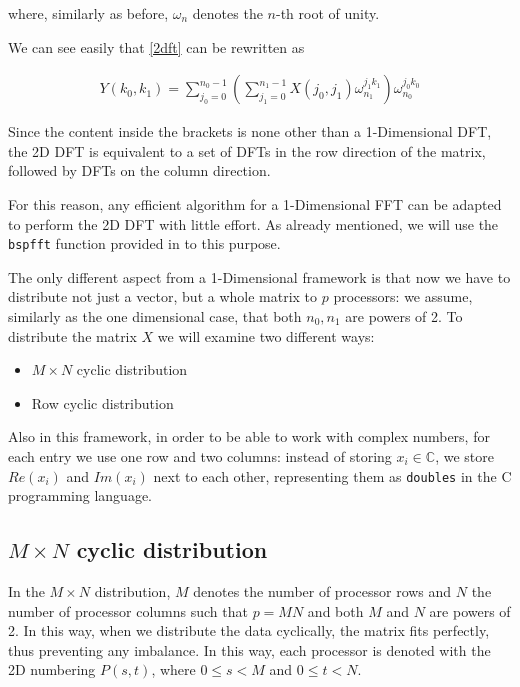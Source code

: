 \documentclass[a4paper,11pt]{article}
\newcommand{\C}{\mathbb{C}}
\begin{document}
where, similarly as before, $\omega_n$ denotes the $n$-th root of unity.

We can see easily that \eqref{2dft} can be rewritten as

\begin{align}
 \label{2dft-1} Y(k_0,k_1) = \sum_{j_0=0}^{n_0-1} \left(\sum_{j_1=0}^{n_1-1} X(j_0,j_1)  \omega_{n_1}^{j_1 k_1} \right) \omega_{n_0}^{j_0 k_0}
\end{align}

Since the content inside the brackets is none other than a 1-Dimensional DFT, the 2D DFT is equivalent to a set of DFTs in the row direction of the matrix, followed by DFTs on the column direction.

For this reason, any efficient algorithm for a 1-Dimensional FFT can be adapted to perform the 2D DFT with little effort. As already mentioned, we will use the \verb|bspfft| function provided in \citep{bspedupack} to this purpose.

The only different aspect from a 1-Dimensional framework is that now we have to distribute not just a vector, but a whole matrix to $p$ processors: we assume, similarly as the one dimensional case, that both $n_0,n_1$ are powers of 2. To distribute the matrix $X$ we will examine two different ways:

\begin{itemize}
\item $M\times N$ cyclic distribution
\item Row cyclic distribution
\end{itemize}

Also in this framework, in order to be able to work with complex numbers, for each entry we use one row and two columns: instead of storing $x_i \in \C$, we store $Re(x_i)$ and $Im(x_i)$ next to each other, representing them as \verb|doubles| in the C programming language.

\subsection{$M\times N$ cyclic distribution}

In the $M \times N$ distribution, $M$ denotes the number of processor rows and $N$ the number of processor columns \citep[Chapter~2]{parsc} such that $p=MN$ and both $M$ and $N$ are powers of 2. In this way, when we distribute the data cyclically, the matrix fits perfectly, thus preventing any imbalance. In this way, each processor is denoted with the 2D numbering $P(s,t)$, where $0\leq s < M$ and $0 \leq t < N$.
\end{document}
